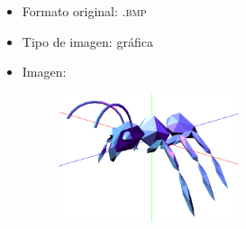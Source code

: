 \documentclass[11pt,a4paper]{article}
\begin{document}
\begin{itemize}
	\item Formato original: \textsc{.bmp}
	\item Tipo de imagen: gráfica
	\item Imagen:
		\begin{figure}[H]
		\centering
			\includegraphics[width=0.5\textwidth]{Fotos/graficos.png}
		\end{figure}	
\end{itemize}
\end{document}
